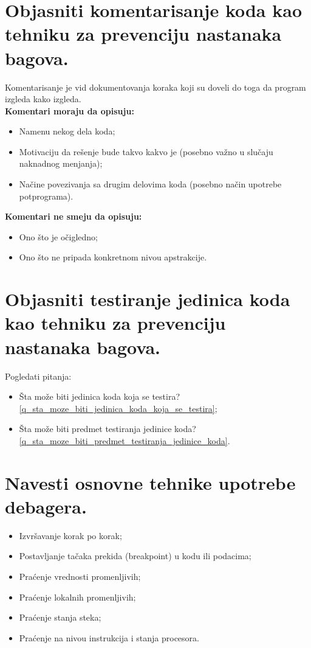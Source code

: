 \documentclass[a4paper]{article}
\begin{document}
\section{Objasniti komentarisanje koda kao tehniku za prevenciju nastanaka bagova.}
  Komentarisanje je vid dokumentovanja koraka koji su doveli do toga da program izgleda
  kako izgleda. \\
  \noindent \textbf{Komentari moraju da opisuju:}
  \begin{itemize}
    \item Namenu nekog dela koda;
    \item Motivaciju da rešenje bude takvo kakvo je (posebno važno u slučaju naknadnog menjanja);
    \item Načine povezivanja sa drugim delovima koda (posebno način upotrebe potprograma).
  \end{itemize}
  \textbf{Komentari ne smeju da opisuju:}
  \begin{itemize}
    \item Ono što je očigledno;
    \item Ono što ne pripada konkretnom nivou apstrakcije.
  \end{itemize}

\section{Objasniti testiranje jedinica koda kao tehniku za prevenciju nastanaka bagova.}
  \noindent Pogledati pitanja: 
  \begin{itemize}
    \item Šta može biti jedinica koda koja se testira? 
          \ref{q_sta_moze_biti_jedinica_koda_koja_se_testira};
    \item Šta može biti predmet testiranja jedinice koda? 
          \ref{q_sta_moze_biti_predmet_testiranja_jedinice_koda}.
  \end{itemize}

\section{Navesti osnovne tehnike upotrebe debagera.}
  \begin{itemize}
    \item Izvršavanje korak po korak;
    \item Postavljanje tačaka prekida (breakpoint) u kodu ili podacima;
    \item Praćenje vrednosti promenljivih;
    \item Praćenje lokalnih promenljivih;
    \item Praćenje stanja steka;
    \item Praćenje na nivou instrukcija i stanja procesora.
  \end{itemize}
\end{document}
